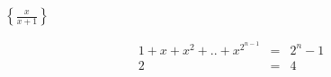 \documentclass[11pt]{article}
\begin{document}
$\displaystyle{\left\{\frac{x}{x+1}\right\}}$

\begin{eqnarray}
1 + x + x^2 + ..+ x^{2^{n-1}} &=& 2^n-1\\
2 &=& 4
\end{eqnarray}
\end{document}

